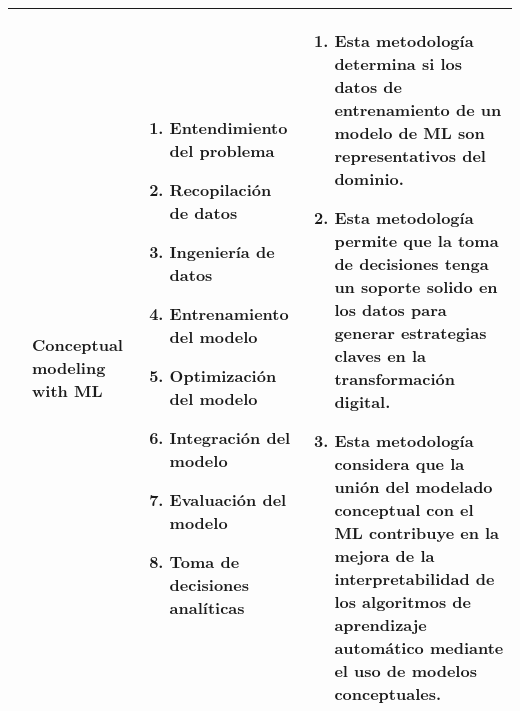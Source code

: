 \begin{table*}
	\begin{threeparttable}	
		\begin{tabular}{ p{2cm} p{4cm} p{5cm} p{6cm}  } \toprule
			\citep{Maass2021}
			&Conceptual modeling with ML
			&  \begin{enumerate}
				\item Entendimiento del problema
				\item Recopilación de datos
				\item Ingeniería de datos
				\item Entrenamiento del modelo
				\item Optimización del modelo
				\item Integración del modelo
				\item Evaluación del modelo
				\item Toma de decisiones analíticas   
			\end{enumerate}
			& \begin{enumerate}
				\item Esta metodología determina si los datos de entrenamiento de un modelo de ML son representativos del dominio.
				\item Esta metodología permite que la toma de decisiones tenga un soporte solido en los datos para generar estrategias claves en la transformación digital.
				\item Esta metodología considera que la unión del modelado conceptual con el ML contribuye en la mejora de la interpretabilidad de los algoritmos de aprendizaje automático mediante el uso de modelos conceptuales.
			\end{enumerate}
			\\ \hline
			

\end{tabular}
\end{threeparttable}
\end{table*}
